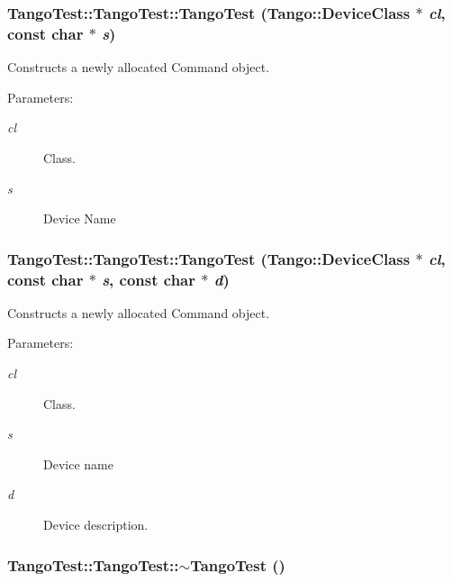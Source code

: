 \subsubsection{\setlength{\rightskip}{0pt plus 5cm}Tango\-Test::Tango\-Test::Tango\-Test (Tango::Device\-Class $\ast$ {\em cl}, const char $\ast$ {\em s})}\label{classTangoTest_1_1TangoTest_z2_1}


Constructs a newly allocated Command object.

\begin{Desc}
\item[Parameters: ]\par
\begin{description}
\item[{\em 
cl}]Class. \item[{\em 
s}]Device Name \end{description}
\end{Desc}
\subsubsection{\setlength{\rightskip}{0pt plus 5cm}Tango\-Test::Tango\-Test::Tango\-Test (Tango::Device\-Class $\ast$ {\em cl}, const char $\ast$ {\em s}, const char $\ast$ {\em d})}\label{classTangoTest_1_1TangoTest_z2_2}


Constructs a newly allocated Command object.

\begin{Desc}
\item[Parameters: ]\par
\begin{description}
\item[{\em 
cl}]Class. \item[{\em 
s}]Device name \item[{\em 
d}]Device description. \end{description}
\end{Desc}
\subsubsection{\setlength{\rightskip}{0pt plus 5cm}Tango\-Test::Tango\-Test::$\sim$Tango\-Test ()}\label{classTangoTest_1_1TangoTest_z3_0}


